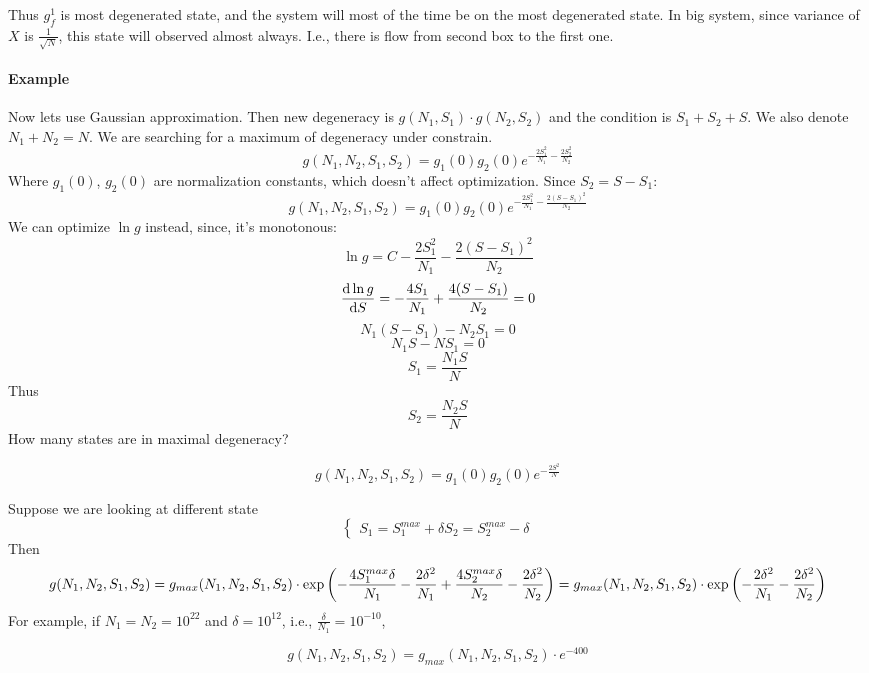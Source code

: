 Thus $g^1_f$ is most degenerated state, and the system will most of the time be on the most degenerated state. In big system, since variance of $X$ is $\frac{1}{\sqrt{N}}$, this state will observed almost always. I.e., there is flow from second box to the first one.

\paragraph{Example}
Now lets use Gaussian approximation. Then new degeneracy is
$g(N_1, S_1) \cdot g(N_2, S_2)$
and the condition is $S_1+S_2+S$. We also denote $N_1+N_2=N$. We are searching for a maximum of degeneracy under constrain.
$$g(N_1,N_2,S_1,S_2) = g_1(0)g_2(0) e^{-\frac{2S_1^2}{N_1}-\frac{2S_2^2}{N_2}}$$
Where $g_1(0)$, $g_2(0)$ are normalization constants, which doesn't affect optimization. Since $S_2 = S-S_1$:
$$g(N_1,N_2,S_1,S_2) = g_1(0)g_2(0) e^{-\frac{2S_1^2}{N_1}-\frac{2(S-S_1)^2}{N_2}}$$
We can optimize $\ln g$ instead, since, it's monotonous:
$$\ln g = C -\frac{2S_1^2}{N_1}-\frac{2(S-S_1)^2}{N_2} $$
$$\dv{\ln g}{S} =  -\frac{4S_1}{N_1}+\frac{4(S-S_1)}{N_2} = 0$$
$$N_1(S-S_1) - N_2 S_1= 0$$
$$N_1S - N S_1= 0$$
$$  S_1= \frac{N_1S}{N}$$
Thus
$$  S_2=  \frac{N_2S}{N}$$
How many states are in maximal degeneracy?

$$g(N_1,N_2,S_1,S_2) = g_1(0)g_2(0) e^{-\frac{2S^2}{N}}$$

Suppose we are looking at different state
$$\begin{cases}
S_1 = S_1^{max} + \delta
S_2 = S_2^{max} - \delta
\end{cases}$$
Then
$$g(N_1,N_2,S_1,S_2) = g_{max}(N_1,N_2,S_1,S_2) \cdot \exp\qty(-\frac{4S_1^{max} \delta}{N_1}-\frac{2\delta^2}{N_1}+\frac{4S_2^{max} \delta}{N_2}-\frac{2\delta^2}{N_2}) = g_{max}(N_1,N_2,S_1,S_2) \cdot \exp\qty(-\frac{2\delta^2}{N_1}-\frac{2\delta^2}{N_2})$$
For example, if $N_1=N_2=10^{22}$  and $\delta = 10^{12}$, i.e., $\frac{\delta}{N_1} = 10^{-10}$, 

$$g(N_1,N_2,S_1,S_2) = g_{max}(N_1,N_2,S_1,S_2) \cdot e^{-400}$$